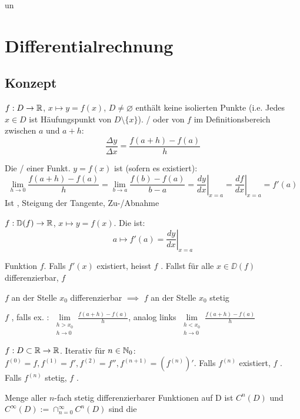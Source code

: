 un\section{Differentialrechnung}

\subsection{Konzept}

\Def $f: D \to \mathbb{R}$, $x \mapsto y = f(x)$, $D \neq \varnothing$ enthält keine
isolierten Punkte (i.e. Jedes $x \in D$ ist Häufungspunkt von $D \setminus \{x\}$).
/ oder 
von $f$ im Definitionsbereich zwischen $a$ und $a+h$:
$$\frac{\Delta y}{\Delta x} = \frac{f(a+h) - f(a)}{h}$$

\Def Die / einer Funkt. $y = f(x)$ 
ist (sofern es existiert):
$$\lim\limits_{h\to 0} \frac{f(a+h)-f(a)}{h} = \lim\limits_{b\to a}\frac{f(b) - f(a)}{b - a} = \left.\frac{dy}{dx}\right|_{x=a} = \left.\frac{df}{dx}\right|_{x=a} = f'(a)$$
Ist , Steigung der Tangente,  Zu-/Abnahme

\Def $f: \mathbb{D}(f) \to \mathbb{R}$, $x \mapsto y = f(x)$. Die  ist:
$$a \mapsto f'(a) = \left. \frac{dy}{dx} \right|_{x=a}$$

\Def Funktion $f$. Falls $f'(x)$ existiert, heisst $f$ .
Fallst für alle $x \in \DD(f)$ differenzierbar, $f$ 

\Satz $f$ an der Stelle $x_0$ differenzierbar $\implies$ $f$ an der Stelle $x_0$ stetig

\Def $f$ , falls ex. :
$\lim\limits_{\substack{h > x_0 \\ h \to 0}}\frac{f(a+h) - f(a)}{h}$, analog links
$\lim\limits_{\substack{h < x_0 \\ h \to 0}}\frac{f(a+h) - f(a)}{h}$

\Def $f: D \subset \mathbb{R} \to \mathbb{R}$. Iterativ  für $n \in \mathbb{N}_0$:
$f^{(0)} = f, f^{(1)} = f', f^{(2)} = f'', f^{(n+1)} = (f^{(n)})'$.
Falls $f^{(n)}$ existiert, $f$ . Falls $f^{(n)}$ stetig,
$f$ .

\Def Menge aller $n$-fach stetig differenzierbarer Funktionen auf D ist $C^n(D)$ und
$C^\infty(D) := \cap_{n=0}^\infty C^n(D)$ sind die 

